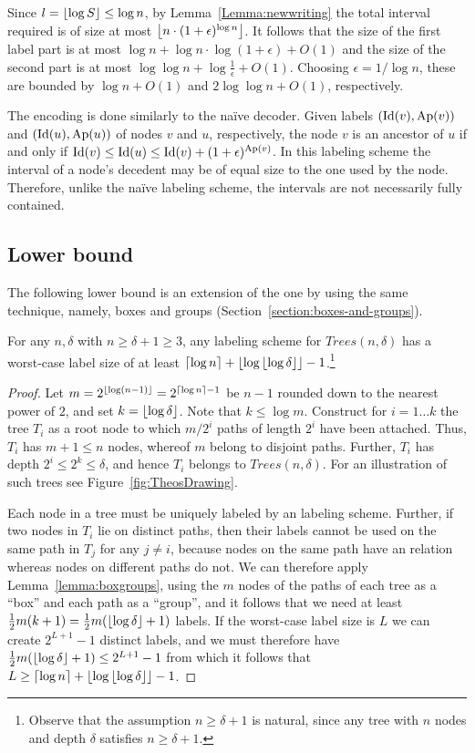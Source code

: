 Since $l = \left\lfloor{\log S}\right\rfloor \leq \log n$, by Lemma~\ref{Lemma:newwriting} the  total interval required is of size at most $\left\lfloor{n \cdot (1+ \epsilon)^{\log n}}\right\rfloor$.
  It follows that the size of the first label part is at most $ \log n +  \log n \cdot \log(1+ \epsilon)+O(1)$ and the size of the second part is at most $\log \log  n + \log\frac{1}{\epsilon}+O(1)$. Choosing $\epsilon = 1/ \log n$, these are bounded by $\log n + O(1)$ and   $2 \log \log n+O(1)$, respectively.
  
 The encoding is done similarly  to the na\"ive decoder.
  Given labels $(\operatorname{Id}(v),\operatorname{Ap}(v))$ and $(\operatorname{Id}(u),\operatorname{Ap}(u))$ of nodes $v$ and $u$, respectively, the node  $v$ is an ancestor of $u$ if and only if $\operatorname{Id}(v) \leq \operatorname{Id}(u) \leq \operatorname{Id}(v)+(1+\epsilon)^{\operatorname{Ap}(v)}$. 
 In this labeling scheme the interval of a node's  decedent  may be of equal size to the one used by the node. Therefore, unlike the na\"ive labeling scheme, the intervals are not necessarily  fully contained. 
 	
\subsection{Lower bound}\label{sub-anc-lower}
The following  lower bound is an extension of the one by  using the same technique, namely, boxes and groups (Section~\ref{section:boxes-and-groups}). 
\begin{theorem} \label{theo:ancestrytreeslower}
For any $n,\delta$ with $n\geq \delta+1\geq 3$, any \ancestry labeling scheme for $Trees(n,\delta)$
has a worst-case label size of at least $\left\lceil{\log n}\right\rceil + \left\lfloor{\log \ensuremath{\left\lfloor{\log \delta}\right\rfloor}}\right\rfloor-1$.\footnote{Observe that the assumption $n\geq \delta+1$ is natural, since any tree with $n$ nodes and depth $\delta$ satisfies $n\geq \delta+1$.}
\end{theorem}
\begin{proof}
Let $m=2^{\left\lfloor{\log (n-1)}\right\rfloor}=2^{\left\lceil{\log n}\right\rceil-1}$ be $n-1$ rounded down to the nearest power of $2$, and set $k=\left\lfloor{\log \delta}\right\rfloor$. Note that $k\leq \log m$. Construct for $i=1\dots k$ the tree $T_i$ as a root node to which $m/2^i$ paths of length $2^i$ have been attached. Thus, $T_i$ has $m+1\leq n$ nodes, whereof $m$ belong to disjoint paths. Further, $T_i$ has depth $2^i\leq 2^k\leq \delta$, and hence $T_i$ belongs to $Trees(n,\delta)$. For an illustration of such trees see Figure~\ref{fig:TheosDrawing}.

Each node in a tree must be uniquely labeled by an \ancestry labeling scheme. Further, if two nodes in $T_i$ lie on distinct paths, then their labels cannot be used on the same path in $T_j$ for any  $j\neq i$, because nodes on the same path have an \ancestry relation whereas nodes on different paths do not. We can therefore apply Lemma~\ref{lemma:boxgroups}, using the $m$ nodes of the paths of each tree as a ``box'' and each path as a ``group'', and it follows that we need at least $\frac{1}{2}m(k+1) = \frac{1}{2}m(\left\lfloor{\log \delta}\right\rfloor+1)$ labels. If the worst-case label size is $L$  we can create $2^{L+1}-1$ distinct labels, and we must therefore have $\frac{1}{2}m(\left\lfloor{\log \delta}\right\rfloor+1)\leq 2^{L+1}-1$ from which it follows that $L\geq \left\lceil{\log n}\right\rceil + \left\lfloor{\log \ensuremath{\left\lfloor{\log \delta}\right\rfloor}}\right\rfloor-1$.
\end{proof}
			
